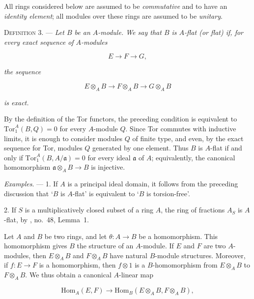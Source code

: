 
All rings considered below are assumed to be \emph{commutative} and to have an
\emph{identity element}; all modules over these rings are assumed to be
\emph{unitary}.


\textsc{Definition 3}. --- \emph{Let $B$ be an
$A$-module. We say that $B$ is $A$-flat (or flat) if, for every exact sequence
of $A$-modules}

\begin{equation*}
E\longrightarrow F\longrightarrow G,
\end{equation*}

\emph{the sequence}

\begin{equation*}
E\otimes_AB\longrightarrow F\otimes_AB\longrightarrow G\otimes_AB
\end{equation*}

\emph{is exact.}

By the definition of the Tor functors, the preceding condition is equivalent
to $\mathrm{Tor}_1^A(B,Q)=0$ for every $A$-module $Q$. Since Tor commutes with
inductive limits, it is enough to consider modules $Q$ of finite type, and
even, by the exact sequence for Tor, modules $Q$ generated by one element.
Thus $B$ is $A$-flat if and only if
$\mathrm{Tor}_1^A(B,A/\mathfrak{a})=0$ for every ideal $\mathfrak{a}$ of $A$;
equivalently, the canonical homomorphism
$\mathfrak{a}\otimes_AB\to B$ is injective.

\emph{Examples}. --- 1. If $A$ is a principal ideal domain, it follows from
the preceding discussion that `$B$ is $A$-flat' is equivalent to `$B$ is
torsion-free'.

2. If $S$ is a multiplicatively closed subset of a ring $A$, the ring of
fractions $A_S$ is $A$-flat, by , no.~48, Lemma~1.

Let $A$ and $B$ be two rings, and let $\theta:A\to B$ be a homomorphism. This
homomorphism gives $B$ the structure of an $A$-module. If $E$ and $F$ are two
$A$-modules, then $E\otimes_AB$ and $F\otimes_AB$ have natural $B$-module
structures. Moreover, if $f:E\to F$ is a homomorphism, then $f\otimes1$ is a
$B$-homomorphism from $E\otimes_AB$ to $F\otimes_AB$. We thus obtain a
canonical $A$-linear map

\begin{equation*}
\mathrm{Hom}_A(E,F)\longrightarrow
\mathrm{Hom}_B(E\otimes_AB,F\otimes_AB),
\end{equation*}

